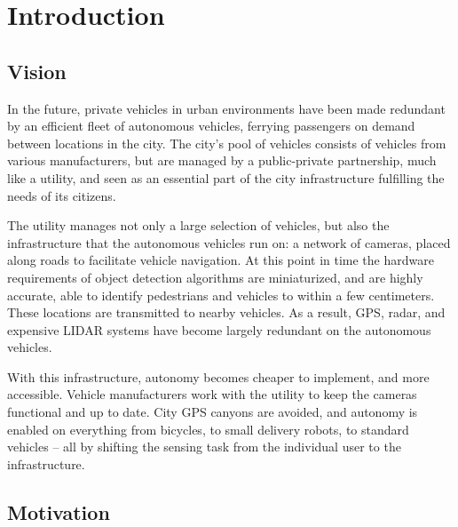 \documentclass[a4paper,12pt,twoside,openright]{report}
\begin{document}
\pagestyle{empty}
\singlespacing

\onehalfspacing

\singlespacing


\setcounter{page}{0}
\pagestyle{plain}
\tableofcontents
\listoffigures
\listoftables

\onehalfspacing


\chapter{Introduction}
\setcounter{page}{1} 

\section{Vision}

In the future, private vehicles in urban environments have been made redundant by an efficient
fleet of autonomous vehicles, ferrying passengers on demand between locations in 
the city. The city's pool of vehicles consists of vehicles from various manufacturers, 
but are managed by a public-private partnership, much like a utility, and 
seen as an essential part of the city infrastructure fulfilling the needs of its citizens.

The utility manages not only a large selection of vehicles, but also the infrastructure 
that the autonomous vehicles run on: a network of cameras, placed along roads to 
facilitate vehicle navigation. At this point in time the hardware requirements of
object detection algorithms are miniaturized, and are highly accurate, able to identify
pedestrians and vehicles to within a few centimeters. These locations are
transmitted to nearby vehicles. As a result, GPS, radar, and expensive LIDAR systems
have become largely redundant on the autonomous vehicles.

With this infrastructure, autonomy becomes cheaper to implement,
and more accessible. Vehicle manufacturers work with the utility to keep the cameras 
functional and up to date. City GPS canyons are avoided, and autonomy is enabled 
on everything from bicycles, to small delivery robots, to standard vehicles -- all by 
shifting the sensing task from the individual user to the infrastructure.

\section{Motivation}
\end{document}
